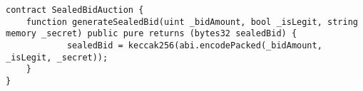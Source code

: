 \begin{lstlisting}[language=Solidity]
contract SealedBidAuction {
	function generateSealedBid(uint _bidAmount, bool _isLegit, string memory _secret) public pure returns (bytes32 sealedBid) {
			sealedBid = keccak256(abi.encodePacked(_bidAmount, _isLegit, _secret));
	}
}
\end{lstlisting}